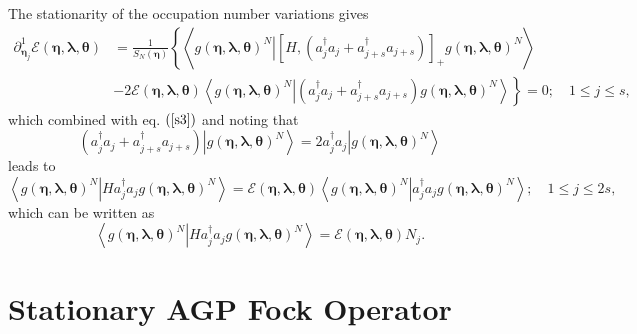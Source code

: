 \documentclass[aps,preprint]{revtex4}%
\begin{document}
The stationarity of the occupation number variations gives
\begin{align}
\partial_{\mathbf{\eta}_{j}}^{1}\mathcal{E}\left(  \mathbf{\eta}%
,\mathbf{\lambda},\mathbf{\theta}\right)   &  =\frac{1}{S_{N}\left(
\mathbf{\eta}\right)  }\left\{  \left\langle \left.  g\left(  \mathbf{\eta
},\mathbf{\lambda},\mathbf{\theta}\right)  ^{N}\right\vert \left[  H,\left(
a_{j}^{\dagger}a_{j}+a_{j+s}^{\dagger}a_{j+s}\right)  \right]  _{+}g\left(
\mathbf{\eta},\mathbf{\lambda},\mathbf{\theta}\right)  ^{N}\right\rangle
\right. \nonumber\\
&  -\left.  2\mathcal{E}\left(  \mathbf{\eta},\mathbf{\lambda},\mathbf{\theta
}\right)  \left\langle \left.  g\left(  \mathbf{\eta},\mathbf{\lambda
},\mathbf{\theta}\right)  ^{N}\right\vert \left(  a_{j}^{\dagger}a_{j}%
+a_{j+s}^{\dagger}a_{j+s}\right)  g\left(  \mathbf{\eta},\mathbf{\lambda
},\mathbf{\theta}\right)  ^{N}\right\rangle \right\}  =0;\quad1\leq j\leq s,
\end{align}
which combined with eq. $\left(  \ref{s3}\right)  $ and noting that
\begin{equation}
\left(  a_{j}^{\dagger}a_{j}+a_{j+s}^{\dagger}a_{j+s}\right)  \left\vert
g\left(  \mathbf{\eta},\mathbf{\lambda},\mathbf{\theta}\right)  ^{N}%
\right\rangle =2a_{j}^{\dagger}a_{j}\left\vert g\left(  \mathbf{\eta
},\mathbf{\lambda},\mathbf{\theta}\right)  ^{N}\right\rangle
\end{equation}
leads to
\begin{equation}
\left\langle \left.  g\left(  \mathbf{\eta},\mathbf{\lambda},\mathbf{\theta
}\right)  ^{N}\right\vert Ha_{j}^{\dagger}a_{j}g\left(  \mathbf{\eta
},\mathbf{\lambda},\mathbf{\theta}\right)  ^{N}\right\rangle =\mathcal{E}%
\left(  \mathbf{\eta},\mathbf{\lambda},\mathbf{\theta}\right)  \left\langle
\left.  g\left(  \mathbf{\eta},\mathbf{\lambda},\mathbf{\theta}\right)
^{N}\right\vert a_{j}^{\dagger}a_{j}g\left(  \mathbf{\eta},\mathbf{\lambda
},\mathbf{\theta}\right)  ^{N}\right\rangle ;\quad1\leq j\leq2s,
\end{equation}
which can be written as
\begin{equation}
\left\langle \left.  g\left(  \mathbf{\eta},\mathbf{\lambda},\mathbf{\theta
}\right)  ^{N}\right\vert Ha_{j}^{\dagger}a_{j}g\left(  \mathbf{\eta
},\mathbf{\lambda},\mathbf{\theta}\right)  ^{N}\right\rangle =\mathcal{E}%
\left(  \mathbf{\eta},\mathbf{\lambda},\mathbf{\theta}\right)  N_{j}.
\end{equation}


\section{Stationary AGP Fock Operator\label{AGPFock}}
\end{document}

